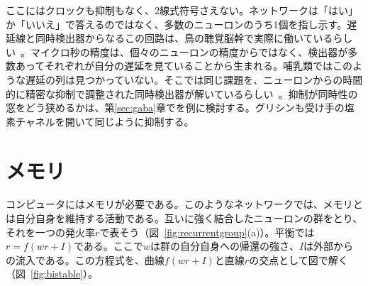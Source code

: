 ここにはクロックも抑制もなく、2線式符号さえない。ネットワークは「はい」か「いいえ」で答えるのではなく、多数のニューロンのうち1個を指し示す。遅延線と同時検出器からなるこの回路は、鳥の聴覚脳幹で実際に働いているらしい~\cite{Carr1990}。マイクロ秒の精度は、個々のニューロンの精度からではなく、検出器が多数あってそれぞれが自分の遅延を見ていることから生まれる。哺乳類ではこのような遅延の列は見つかっていない。そこでは同じ課題を、ニューロンからの時間的に精密な抑制で調整された同時検出器が解いているらしい~\cite{Brand2002,Grothe2010}。抑制が同時性の窓をどう狭めるかは、第\ref{sec:gaba}章でを例に検討する。グリシンも受け手の塩素チャネルを開いて同じように抑制する。

\section{メモリ}

コンピュータにはメモリが必要である。このようなネットワークでは、メモリとは自分自身を維持する活動である。互いに強く結合したニューロンの群をとり、それを一つの発火率$r$で表そう（図~\ref{fig:recurrentgroup}(a)）。平衡では$r=f(wr+I)$である。ここで$w$は群の自分自身への帰還の強さ、$I$は外部からの流入である。この方程式を、曲線$f(wr+I)$と直線$r$の交点として図で解く（図~\ref{fig:bistable}）。

